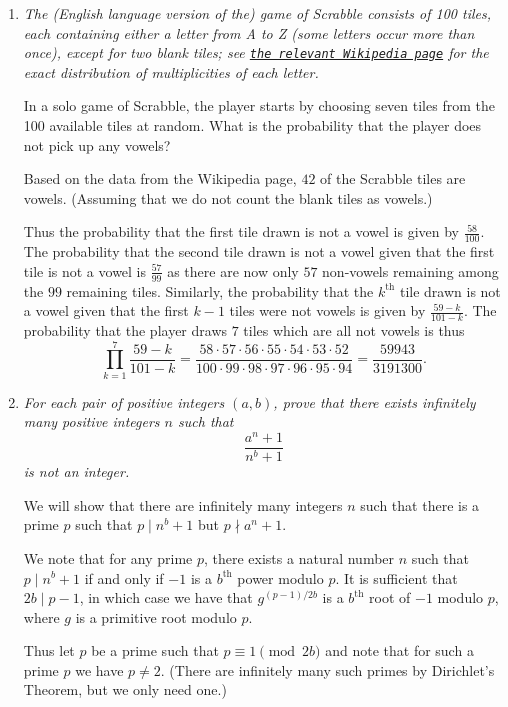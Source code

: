 \documentclass{article}
\begin{document}
\begin{enumerate}[1.]
\vspace{6pt}
\item %
{\itshape The (English language version of the) game of Scrabble\texttrademark{} consists of 100 tiles, each containing either a letter from A to Z (some letters occur more than once), except for two blank tiles; see \href{https://en.wikipedia.org/wiki/Scrabble_letter_distributions#English}{\texttt{the relevant Wikipedia page}} for the exact distribution of multiplicities of each letter.

In a solo game of Scrabble, the player starts by choosing seven tiles from the 100 available tiles at random. What is the probability that the player does not pick up any vowels?}

Based on the data from the Wikipedia page, $42$ of the Scrabble tiles are vowels. (Assuming that we do not count the blank tiles as vowels.)

Thus the probability that the first tile drawn is not a vowel is given by $\frac{58}{100}$. The probability that the second tile drawn is not a vowel given that the first tile is not a vowel is $\frac{57}{99}$ as there are now only $57$ non-vowels remaining among the $99$ remaining tiles. Similarly, the probability that the $k^\text{th}$ tile drawn is not a vowel given that the first $k - 1$ tiles were not vowels is given by $\frac{59 - k}{101 - k}$. The probability that the player draws $7$ tiles which are all not vowels is thus
\[
	\prod_{k = 1}^{7} \frac{59 - k}{101 - k} = \frac{58 \cdot 57 \cdot 56 \cdot 55 \cdot 54 \cdot 53 \cdot 52}{100 \cdot 99 \cdot 98 \cdot 97 \cdot 96 \cdot 95 \cdot 94} = \frac{59943}{3191300}.
\]


\vspace{6pt}
\item %
{\itshape For each pair of positive integers $(a, b)$, prove that there exists infinitely many positive integers $n$ such that
\[ \frac{a^n + 1}{n^b + 1} \]
is not an integer.}

We will show that there are infinitely many integers $n$ such that there is a prime $p$ such that $p \mid n^b + 1$ but $p \nmid a^n + 1$.

We note that for any prime $p$, there exists a natural number $n$ such that $p \mid n^b + 1$ if and only if $-1$ is a $b^\text{th}$ power modulo $p$. It is sufficient that $2b \mid p - 1$, in which case we have that $g^{(p - 1)/2b}$ is a $b^\text{th}$ root of $-1$ modulo $p$, where $g$ is a primitive root modulo $p$.

Thus let $p$ be a prime such that $p \equiv 1 \pmod{2b}$ and note that for such a prime $p$ we have $p \neq 2$. (There are infinitely many such primes by Dirichlet's Theorem, but we only need one.)


\end{enumerate}
\end{document}
